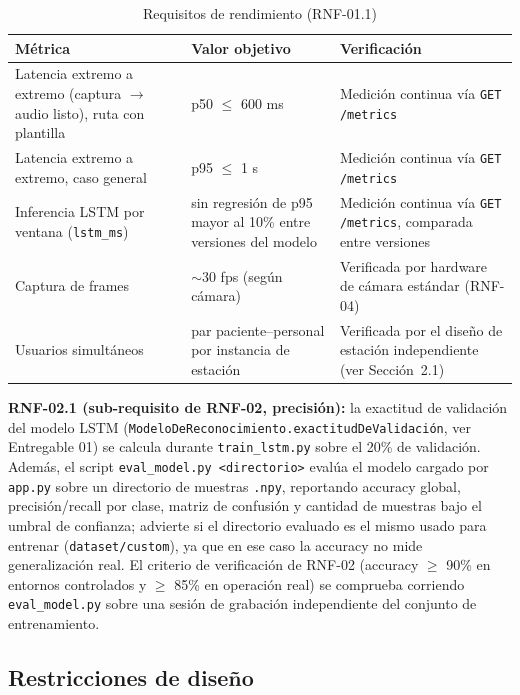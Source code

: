 \begin{table}[H]
    \centering
    \caption{Requisitos de rendimiento (RNF-01.1)}
    \label{tab:rendimiento}
    \small
    \begin{tabularx}{\textwidth}{>{\raggedright\arraybackslash}p{5.2cm} >{\raggedright\arraybackslash}p{3.6cm} X}
        \toprule
        \textbf{Métrica} & \textbf{Valor objetivo} & \textbf{Verificación} \\
        \midrule
        Latencia extremo a extremo (captura $\rightarrow$ audio listo), ruta con plantilla & p50 $\leq$ 600 ms & Medición continua vía \texttt{GET /metrics} \\
        Latencia extremo a extremo, caso general & p95 $\leq$ 1 s & Medición continua vía \texttt{GET /metrics} \\
        Inferencia LSTM por ventana (\texttt{lstm\_ms}) & sin regresión de p95 mayor al 10\% entre versiones del modelo & Medición continua vía \texttt{GET /metrics}, comparada entre versiones \\
        Captura de frames & $\sim$30 fps (según cámara) & Verificada por hardware de cámara estándar (RNF-04) \\
        Usuarios simultáneos & 1 par paciente--personal por instancia de estación & Verificada por el diseño de estación independiente (ver Sección~2.1) \\
        \bottomrule
    \end{tabularx}
\end{table}

\textbf{RNF-02.1 (sub-requisito de RNF-02, precisión):} la
exactitud de validación del modelo LSTM (\texttt{ModeloDeReconocimiento.exactitudDeValidación},
ver Entregable 01) se calcula durante \texttt{train\_lstm.py} sobre el 20\%
de validación. Además, el script \texttt{eval\_model.py <directorio>}
evalúa el modelo cargado por \texttt{app.py} sobre un directorio de
muestras \texttt{.npy}, reportando accuracy global, precisión/recall por
clase, matriz de confusión y cantidad de muestras bajo el umbral de
confianza; advierte si el directorio evaluado es el mismo usado para
entrenar (\texttt{dataset/custom}), ya que en ese caso la accuracy no mide
generalización real. El criterio de verificación de RNF-02 (accuracy
$\geq$ 90\% en entornos controlados y $\geq$ 85\% en operación real) se
comprueba corriendo \texttt{eval\_model.py} sobre una sesión de grabación
independiente del conjunto de entrenamiento.

\subsection{Restricciones de diseño}

